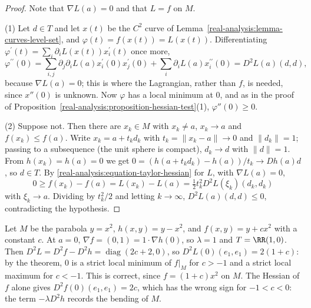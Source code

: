 \begin{proof}
Note that $\nabla L(a) = 0$ and that $L = f$ on $M$.

(1) Let $d \in T$ and let $x(t)$ be the $C^2$ curve of Lemma~\ref{real-analysis:lemma-curves-level-set}, and $\varphi(t) = f(x(t)) = L(x(t))$. Differentiating
$\varphi^{\prime}(t) = \sum_i\partial_iL(x(t))x_i^{\prime}(t)$ once more,
\[
\varphi^{\prime\prime}(0) = \sum_{i,j}\partial_j\partial_iL(a)x_i^{\prime}(0)x_j^{\prime}(0) + \sum_i\partial_iL(a)x_i^{\prime\prime}(0) = D^2L(a)(d, d),
\]
because $\nabla L(a) = 0$; this is where the Lagrangian, rather than $f$, is needed, since $x''(0)$ is unknown. Now $\varphi$ has a local minimum at $0$, and as in the proof of
Proposition~\ref{real-analysis:proposition-hessian-test}(1), $\varphi''(0) \geq 0$.

(2) Suppose not. Then there are $x_k \in M$ with $x_k \neq a$, $x_k \to a$ and $f(x_k) \leq f(a)$. Write $x_k = a + t_kd_k$ with $t_k = \|x_k - a\| \to 0$ and $\|d_k\| = 1$; passing to a subsequence
(the unit sphere is compact), $d_k \to d$ with $\|d\| = 1$. From $h(x_k) = h(a) = 0$ we get $0 = (h(a + t_kd_k) - h(a))/t_k \to Dh(a)d$, so $d \in T$. By \eqref{real-analysis:equation-taylor-hessian} for $L$,
with $\nabla L(a) = 0$,
\[
0 \geq f(x_k) - f(a) = L(x_k) - L(a) = \tfrac12t_k^2D^2L(\xi_k)(d_k, d_k)
\]
with $\xi_k \to a$. Dividing by $t_k^2/2$ and letting $k \to \infty$, $D^2L(a)(d, d) \leq 0$, contradicting the hypothesis.
\end{proof}

\begin{example}\label{real-analysis:example-second-order}
Let $M$ be the parabola $y = x^2$, $h(x, y) = y - x^2$, and $f(x, y) = y + cx^2$ with a constant $c$. At $a = 0$, $\nabla f = (0, 1) = 1 \cdot \nabla h(0)$, so $\lambda = 1$ and $T = \RR(1, 0)$. Then
$D^2L = D^2f - D^2h = \operatorname{diag}(2c + 2, 0)$, so $D^2L(0)(e_1, e_1) = 2(1 + c)$: by the theorem, $0$ is a strict local minimum of $f|_M$ for $c > -1$ and a strict local maximum for $c < -1$.
This is correct, since $f = (1 + c)x^2$ on $M$. The Hessian of $f$ alone gives $D^2f(0)(e_1, e_1) = 2c$, which has the wrong sign for $-1 < c < 0$: the term $-\lambda D^2h$ records the bending of $M$.
\end{example}

